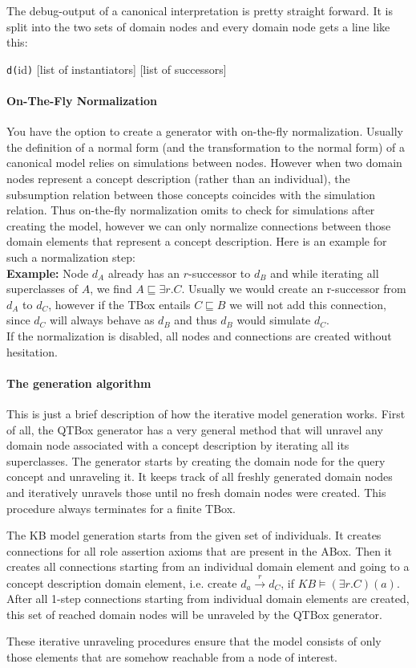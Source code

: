 \documentclass{article}
\begin{document}
The debug-output of a canonical interpretation is pretty straight forward. It is
split into the two sets of domain nodes and every domain node gets a line like
this:
\begin{center}
\texttt{d(}id\texttt{)} [list of instantiators] [list of successors]
\end{center}

\paragraph{On-The-Fly Normalization}
You have the option to create a generator with on-the-fly normalization. Usually
the definition of a normal form (and the transformation to the normal form) of a
canonical model relies on simulations between nodes. However when two domain
nodes represent a concept description (rather than an individual), the
subsumption relation between those concepts coincides with the simulation
relation. Thus on-the-fly normalization omits to check for simulations after
creating the model, however we can only normalize connections between those
domain elements that represent a concept description. Here is an example for
such a normalization step:\\
\textbf{Example:} Node $d_A$ already has an $r$-successor to $d_B$ and while
iterating all superclasses of $A$, we find $A\sqsubseteq \exists r.C$. Usually
we would create an r-successor from $d_A$ to $d_C$, however if the TBox entails
$C\sqsubseteq B$ we will not add this connection, since $d_C$ will always behave
as $d_B$ and thus $d_B$ would simulate $d_C$.\\
If the normalization is disabled, all nodes and connections are created without
hesitation.

\paragraph{The generation algorithm}
This is just a brief description of how the iterative model generation works.
First of all, the QTBox generator has a very general method that will unravel
any domain node associated with a concept description by iterating all its
superclasses. The generator starts by creating the domain node for the query
concept and unraveling it. It keeps track of all freshly generated domain nodes
and iteratively unravels those until no fresh domain nodes were created. This
procedure always terminates for a finite TBox.

The KB model generation starts from the given set of individuals. It creates
connections for all role assertion axioms that are present in the ABox. Then it
creates all connections starting from an individual domain element and going to
a concept description domain element, i.e. create
$d_a\overset{r}{\rightarrow}d_C$, if $KB\models (\exists r.C)(a)$. After all
1-step connections starting from individual domain elements are created, this
set of reached domain nodes will be unraveled by the QTBox generator.

These iterative unraveling procedures ensure that the model consists of only
those elements that are somehow reachable from a node of interest.
\end{document}
